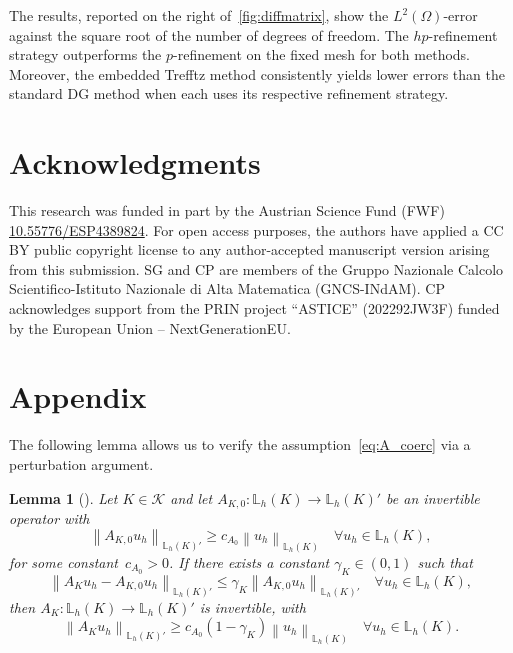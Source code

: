 \documentclass[a4paper,twoside,10pt]{article}
\newtheorem{lemma}[theorem]{Lemma}
\newcommand{\cAP}{c_{A_0}}
\newcommand{\AK}{{A_K}}
\newcommand{\LKh}{\mathbb{L}_h(K)}
\newcommand*{\norm}[1]{\left\|#1\right\|}
\newcommand{\calK}{\mathcal{K}}
\numberwithin{equation}{section}
\begin{document}
The results, reported on the right of~\cref{fig:diffmatrix}, show the $L^2(\Omega)$-error against the square root of the number of degrees of freedom.
The $hp$-refinement strategy outperforms the $p$-refinement on the fixed mesh for both methods.
Moreover, the embedded Trefftz method consistently yields lower errors than the standard DG method when each uses its respective refinement strategy.

\section*{Acknowledgments}
This research was funded in part by the Austrian Science Fund (FWF) 
\href{https://doi.org/10.55776/ESP4389824}{10.55776/ESP4389824}.
For open access purposes, the authors have applied a CC BY public copyright license to any author-accepted manuscript version arising from this submission. SG and CP are members of the Gruppo Nazionale Calcolo
Scientifico-Istituto Nazionale di Alta Matematica (GNCS-INdAM).
CP acknowledges support from the PRIN project ``ASTICE'' (202292JW3F) funded by the European Union -- NextGenerationEU.

\sloppy
 
	


\appendix
\section{Appendix}

	The following lemma allows us to verify the assumption~\eqref{eq:A_coerc} via a perturbation argument.
	\begin{lemma}[{\cite[Lemma 4.2]{LLSV_ARXIV_2024}}]
		\label{lem:abstractneumann}
		Let $K\in\calK$ and let $A_{K,0}:\LKh \to \LKh'$ be an invertible operator with 
		\begin{equation*}
			\norm{A_{K,0}  u_h }_{\LKh'} \geq \cAP \norm{u_h}_{{\LKh}}
			\quad \forall u_h \in \LKh,
		\end{equation*}
        for some constant~$c_{A_0} > 0$. 
        If there exists a constant $\gamma_K \in (0,1)$ such that
		\begin{equation}\label{eq:prototype}
			\norm{\AK  u _h- A_{K,0}u_h}_{\LKh'}\le\gamma_K\norm{A_{K,0}u_h}_{\LKh'} \quad \forall u_h\in \LKh,
		\end{equation}
		then $\AK : \LKh \to \LKh'$ is invertible, with
		\begin{equation*}
			\norm{A_{K}  u_h }_{\LKh'} \geq \cAP(1-\gamma_K)\norm{u_h}_{{\LKh}}
			\quad \forall u_h \in \LKh.
		\end{equation*}
 	\end{lemma}
\end{document}
